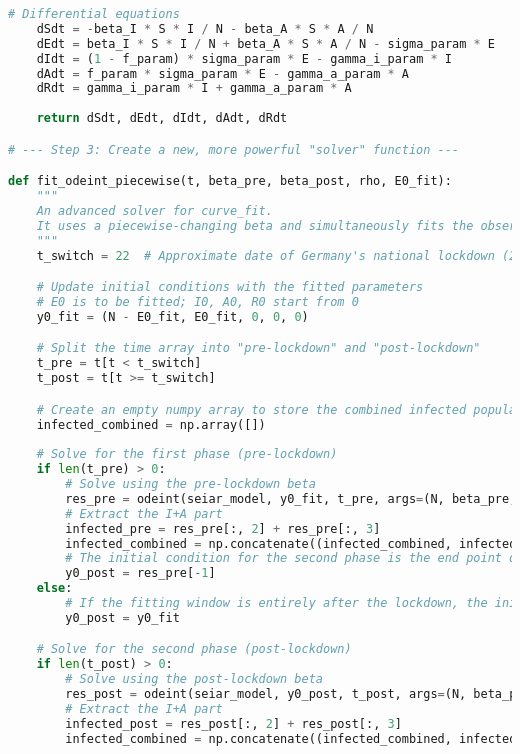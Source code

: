 \begin{lstlisting}[language=Python, caption={Python script for fitting a two-stage piecewise deterministic SEIAR model, corresponding to the pre- and post-lockdown phases.}]
    # Differential equations
    dSdt = -beta_I * S * I / N - beta_A * S * A / N
    dEdt = beta_I * S * I / N + beta_A * S * A / N - sigma_param * E
    dIdt = (1 - f_param) * sigma_param * E - gamma_i_param * I
    dAdt = f_param * sigma_param * E - gamma_a_param * A
    dRdt = gamma_i_param * I + gamma_a_param * A
    
    return dSdt, dEdt, dIdt, dAdt, dRdt

# --- Step 3: Create a new, more powerful "solver" function ---

def fit_odeint_piecewise(t, beta_pre, beta_post, rho, E0_fit):
    """
    An advanced solver for curve_fit.
    It uses a piecewise-changing beta and simultaneously fits the observation proportion rho and initial exposed count E0.
    """
    t_switch = 22  # Approximate date of Germany's national lockdown (2020-03-22), corresponding to day 22 in the data

    # Update initial conditions with the fitted parameters
    # E0 is to be fitted; I0, A0, R0 start from 0
    y0_fit = (N - E0_fit, E0_fit, 0, 0, 0)

    # Split the time array into "pre-lockdown" and "post-lockdown"
    t_pre = t[t < t_switch]
    t_post = t[t >= t_switch]

    # Create an empty numpy array to store the combined infected population
    infected_combined = np.array([])
    
    # Solve for the first phase (pre-lockdown)
    if len(t_pre) > 0:
        # Solve using the pre-lockdown beta
        res_pre = odeint(seiar_model, y0_fit, t_pre, args=(N, beta_pre, F, SIGMA, GAMMA_I, GAMMA_A))
        # Extract the I+A part
        infected_pre = res_pre[:, 2] + res_pre[:, 3]
        infected_combined = np.concatenate((infected_combined, infected_pre))
        # The initial condition for the second phase is the end point of the first phase
        y0_post = res_pre[-1]
    else:
        # If the fitting window is entirely after the lockdown, the initial condition for the second phase is our specified y0_fit
        y0_post = y0_fit

    # Solve for the second phase (post-lockdown)
    if len(t_post) > 0:
        # Solve using the post-lockdown beta
        res_post = odeint(seiar_model, y0_post, t_post, args=(N, beta_post, F, SIGMA, GAMMA_I, GAMMA_A))
        # Extract the I+A part
        infected_post = res_post[:, 2] + res_post[:, 3]
        infected_combined = np.concatenate((infected_combined, infected_post))


\end{lstlisting}
